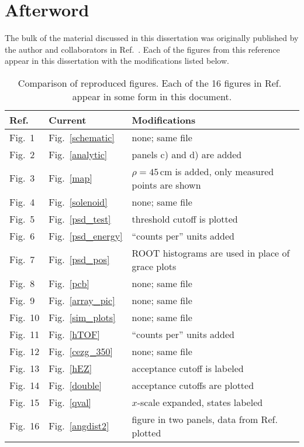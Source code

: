 \chapter{Afterword}
\label{fig_notes}
The bulk of the material discussed in this dissertation was originally published by the author and collaborators in Ref.~\cite{Lighthall_2010}.  Each of the figures from this reference appear in this dissertation with the modifications listed below.
\renewcommand{\arraystretch}{1.3} %
\begin{table*}[ht]%
  \centering
  \begin{tabular}{lll}
    \hline
    Ref.~\cite{Lighthall_2010}&Current&Modifications\\
    \hline \hline
    Fig.~1&Fig.~\ref{schematic}&none; same file\\
    Fig.~2&Fig.~\ref{analytic}&panels c) and d) are added\\
    Fig.~3&Fig.~\ref{map}&$\rho=45$\,cm is added, only measured points are shown\\
    Fig.~4&Fig.~\ref{solenoid}&none; same file\\
    Fig.~5&Fig.~\ref{psd_test}&threshold cutoff is plotted\\
    Fig.~6&Fig.~\ref{psd_energy}&``counts per'' units added\\
    Fig.~7&Fig.~\ref{psd_pos}&ROOT histograms are used in place of grace plots\\
    Fig.~8&Fig.~\ref{pcb}&none; same file\\
    Fig.~9&Fig.~\ref{array_pic}&none; same file\\
    Fig.~10&Fig.~\ref{sim_plots}&none; same file\\
    Fig.~11&Fig.~\ref{hTOF}&``counts per'' units added\\
    Fig.~12&Fig.~\ref{cezg_350}&none; same file\\
    Fig.~13&Fig.~\ref{hEZ}&acceptance cutoff is labeled\\
    Fig.~14&Fig.~\ref{double}&acceptance cutoffs are plotted\\
    Fig.~15&Fig.~\ref{qval}&$x$-scale expanded, states labeled\\
    Fig.~16&Fig.~\ref{angdist2}&figure in two panels, data from Ref.~\cite{Mermaz_1971} plotted\\
    \hline
  \end{tabular}
  \caption[Comparison of reproduced figures.]{Comparison of reproduced figures.  Each of the 16 figures in Ref.~\cite{Lighthall_2010} appear in some form in this document.}
  \label{fig_corr}
\end{table*}